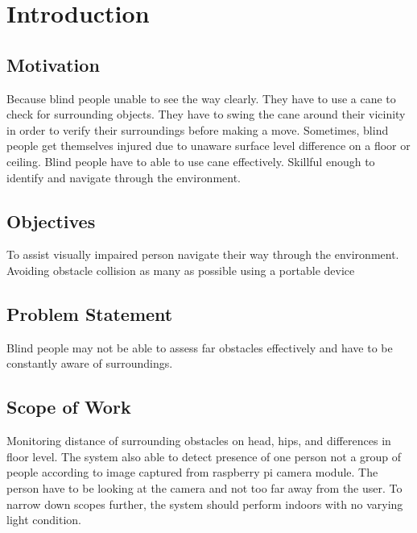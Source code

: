 
\chapter{Introduction} %

\label{Chapter1} %



\section{Motivation}

Because blind people unable to see the way clearly. They have to use a cane to check for surrounding objects. They have to swing the cane around their vicinity in order to verify their surroundings before making a move. Sometimes, blind people get themselves injured due to unaware surface level difference on a floor or ceiling. Blind people have to able to use cane effectively. Skillful enough to identify and navigate through the environment.


\section{Objectives} 
To assist visually impaired person navigate their way through the environment. Avoiding obstacle collision as many as possible using a portable device

\section{Problem Statement}
Blind people may not be able to assess far obstacles effectively and have to be constantly aware of surroundings.

\section{Scope of Work}
Monitoring distance of surrounding obstacles on head, hips, and differences in floor level. The system also able to detect presence of one person not a group of people according to image captured from raspberry pi camera module. The person have to be looking at the camera and not too far away from the user. To narrow down scopes further, the system should perform indoors with no varying light condition.

